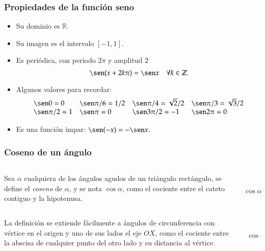 \begin{frame}
\frametitle{Propiedades de la función seno}
\begin{itemize}
\item Su dominio es $\mathbb{R}$.
\item Su imagen es el intervalo $[-1,1]$.
\item Es periódica, con periodo $2\pi$ y amplitud $2$
\[\sen (x+2k\pi)= \sen x\quad \forall k\in \mathbb{Z}\]
\item Algunos valores para recordar:
\[
\begin{array}{llll}
\sen 0=0 & \sen \pi/6= 1/2 & \sen \pi/4=\sqrt{2}/2 & \sen \pi/3= \sqrt{3}/2\\
\sen \pi/2 =1 & \sen \pi = 0 & \sen 3\pi/2=-1 & \sen 2\pi=0
\end{array}
\]
\item Es una función impar: $\sen(-x)=-\sen x$.
\end{itemize}
\end{frame} 


\begin{frame}
\frametitle{Coseno de un ángulo}
\begin{definicion}
\begin{columns}
\begin{column}{0.6\textwidth}
Sea $\alpha$ cualquiera de los ángulos agudos de un triángulo rectángulo, se define el \emph{coseno} de $\alpha$, y se
nota $\cos \alpha$, como el cociente entre el cateto contiguo y la hipotenusa.
\end{column}
\begin{column}{0.2\textwidth}
\begin{center}
\scalebox{1}{}\\
\scriptsize 
$\cos \alpha= \dfrac{AB}{AC}$
\end{center}
\end{column}
\end{columns}
\end{definicion}
\bigskip
\begin{columns}
\begin{column}{0.6\textwidth}
La definición se extiende fácilmente a ángulos de circunferencia con vértice en el origen y uno de sus lados el eje $OX$, como el cociente entre la abscisa de cualquier punto del otro lado y su distancia al vértice.
\end{column}
\begin{column}{0.2\textwidth}
\begin{center}
\scalebox{1}{}\\
\scriptsize
$\cos \alpha= \dfrac{AB}{AC}$
\end{center}
\end{column}
\end{columns}
\end{frame} 


